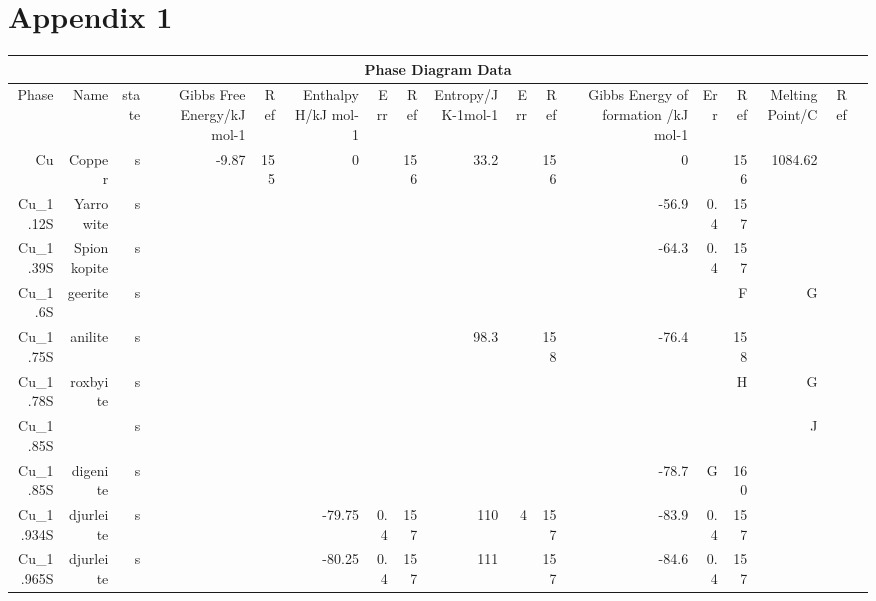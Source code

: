 \begin{table}[htbp]
\chapter{Appendix 1}
  \centering
  \begin{adjustbox}{width=1\textwidth}
    \begin{tabular}{rrrrrrrrrrrrrrrrr}
    \toprule
    \multicolumn{17}{c}{Phase Diagram Data} \\
    \midrule
    Phase & Name  & state & Gibbs Free Energy/kJ mol-1 & Ref   & Enthalpy H/kJ mol-1 & Err   & Ref   & Entropy/J K-1mol-1 & Err   & Ref   & Gibbs Energy of formation /kJ mol-1 & Err   & Ref   & Melting Point/C & Ref   &  \\
    Cu    & Copper & s     & -9.87 & 155   & 0     &       & 156   & 33.2  &       & 156   & 0     &       & 156   & 1084.62 &       &  \\
    Cu\_1.12S & Yarrowite & s     &       &       &       &       &       &       &       &       & -56.9 & 0.4   & 157   &       &       &  \\
    Cu\_1.39S & Spionkopite & s     &       &       &       &       &       &       &       &       & -64.3 & 0.4   & 157   &       &       &  \\
    Cu\_1.6S & geerite & s     &       &       &       &       &       &       &       &       &       &       & F     & G     &       &  \\
    Cu\_1.75S & anilite & s     &       &       &       &       &       & 98.3  &       & 158   & -76.4 &       & 158   &       &       &  \\
    Cu\_1.78S & roxbyite & s     &       &       &       &       &       &       &       &       &       &       & H     & G     &       &  \\
    Cu\_1.85S &       & s     &       &       &       &       &       &       &       &       &       &       &       & J     &       &  \\
    Cu\_1.85S & digenite & s     &       &       &       &       &       &       &       &       & -78.7 & G     & 160   &       &       &  \\
    Cu\_1.934S & djurleite & s     &       &       & -79.75 & 0.4   & 157   & 110   & 4     & 157   & -83.9 & 0.4   & 157   &       &       &  \\
    Cu\_1.965S & djurleite & s     &       &       & -80.25 & 0.4   & 157   & 111   &       & 157   & -84.6 & 0.4   & 157   &       &       &  \\

\end{tabular}
\end{adjustbox}
\end{table}
